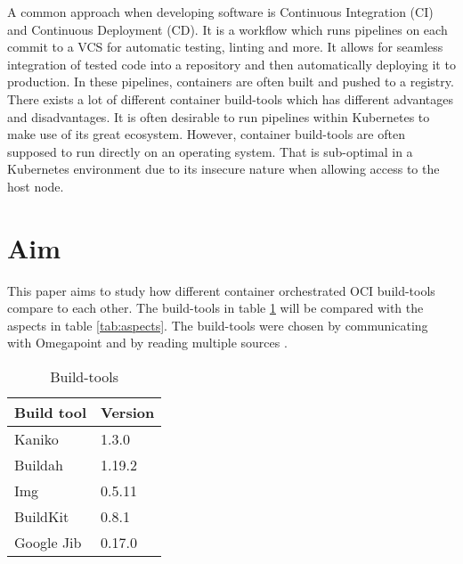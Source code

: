A common approach when developing software is Continuous Integration (CI) and Continuous Deployment (CD). It is a workflow which runs pipelines on each commit to a VCS for automatic testing, linting and more. It allows for seamless integration of tested code into a repository and then automatically deploying it to production. In these pipelines, containers are often built and pushed to a registry. There exists a lot of different container build-tools which has different advantages and disadvantages. It is often desirable to run pipelines within Kubernetes to make use of its great ecosystem. However, container build-tools are often supposed to run directly on an operating system. That is sub-optimal in a Kubernetes environment due to its insecure nature when allowing access to the host node. 

\section{Aim}
This paper aims to study how different container orchestrated OCI build-tools compare to each other. The build-tools in table \ref{tab:build_tools} will be compared with the aspects in table \ref{tab:aspects}. The build-tools were chosen by communicating with Omegapoint and by reading multiple sources \cite{build_compare} \cite{jib}.



\begin{table}[h!]
    \centering
    \begin{tabular}{l|l}
        \textbf{Build tool} & \textbf{Version} \\
        \hline
        Kaniko & 1.3.0 \\
        \hline
        Buildah & 1.19.2 \\
        \hline
        Img & 0.5.11 \\
        \hline
        BuildKit & 0.8.1 \\
        \hline
        Google Jib & 0.17.0
    \end{tabular}
    \caption{Build-tools}
    \label{tab:build_tools}
\end{table}

